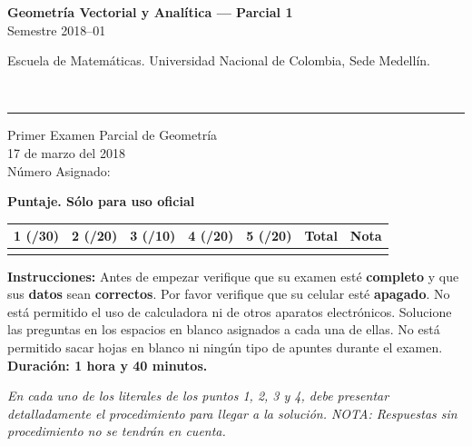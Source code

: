 \documentclass[11pt]{article}
\newcommand{\nota}[1]{{\small\itshape\color{unalblue!70!black} #1}}
\begin{document}
\noindent
\begin{minipage}[t]{0.6\linewidth}
{\small\bfseries Geometría Vectorial y Analítica --- Parcial 1}\\
{\small Semestre 2018--01}
\end{minipage}%
\hfill
\begin{minipage}[t]{0.35\linewidth}
\raggedleft\small Escuela de Matemáticas. Universidad Nacional de Colombia, Sede Medellín.
\end{minipage}\\[2pt]
\rule{\linewidth}{0.6pt}

\begin{center}
{\Large Primer Examen Parcial de Geometría}\\[4pt]
{\small 17 de marzo del 2018}\\[6pt]
{\small Número Asignado: \underline{\hspace{2.5cm}}}
\end{center}

\vspace{6pt}
\textbf{Puntaje. Sólo para uso oficial}

\begin{center}
\small
\begin{tabular}{|c|c|c|c|c|c|c|}
\hline
1 (/30) & 2 (/20) & 3 (/10) & 4 (/20) & 5 (/20) & Total & Nota \\
\hline
 & & & & & & \\
\hline
\end{tabular}
\end{center}

\vspace{10pt}
\textbf{Instrucciones:} Antes de empezar verifique que su examen esté \textbf{completo} y que sus \textbf{datos} sean \textbf{correctos}. Por favor verifique que su celular esté \textbf{apagado}. No está permitido el uso de calculadora ni de otros aparatos electrónicos. Solucione las preguntas en los espacios en blanco asignados a cada una de ellas. No está permitido sacar hojas en blanco ni ningún tipo de apuntes durante el examen. \textbf{Duración: 1 hora y 40 minutos.}

\vspace{6pt}
\nota{En cada uno de los literales de los puntos 1, 2, 3 y 4, debe presentar detalladamente el procedimiento para llegar a la solución. NOTA: Respuestas sin procedimiento no se tendrán en cuenta.}
\end{document}
